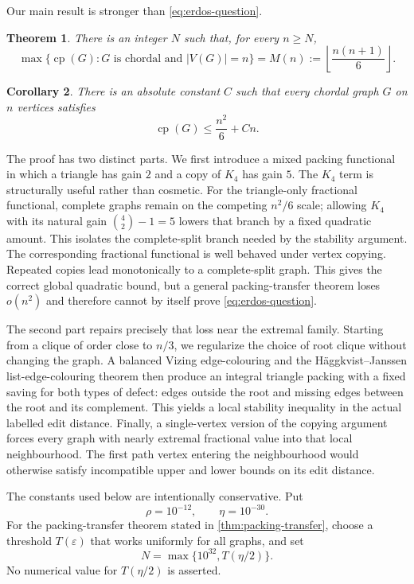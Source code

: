 \documentclass[11pt,reqno]{amsart}
\numberwithin{equation}{section}
\newtheorem{theorem}{Theorem}[section]
\newtheorem{corollary}[theorem]{Corollary}
\theoremstyle{definition}
\theoremstyle{remark}
\newcommand{\cp}{\operatorname{cp}}
\begin{document}
Our main result is stronger than \eqref{eq:erdos-question}.

\begin{theorem}\label{thm:main}
There is an integer $N$ such that, for every $n\geq N$,
\[
  \max\{\cp(G): G\text{ is chordal and }|V(G)|=n\}
  =M(n):=\left\lfloor\frac{n(n+1)}6\right\rfloor .
\]
\end{theorem}

\begin{corollary}\label{cor:erdos81}
There is an absolute constant $C$ such that every chordal graph $G$ on $n$
vertices satisfies
\[
  \cp(G)\leq \frac{n^2}{6}+Cn.
\]
\end{corollary}

The proof has two distinct parts.  We first introduce a mixed packing
functional in which a triangle has gain $2$ and a copy of $K_4$ has gain $5$.
The $K_4$ term is structurally useful rather than cosmetic.  For the
triangle-only fractional functional, complete graphs remain on the competing
$n^2/6$ scale; allowing $K_4$ with its natural gain $\binom42-1=5$ lowers
that branch by a fixed quadratic amount.  This isolates the complete-split
branch needed by the stability argument.
The corresponding fractional functional is well behaved under vertex
copying.  Repeated copies lead monotonically to a complete-split graph.  This
gives the correct global quadratic bound, but a general packing-transfer
theorem loses $o(n^2)$ and therefore cannot by itself prove
\eqref{eq:erdos-question}.

The second part repairs precisely that loss near the extremal family.  Starting
from a clique of order close to $n/3$, we regularize the choice of root clique
without changing the graph.  A balanced Vizing edge-colouring and the
H\"aggkvist--Janssen list-edge-colouring theorem then produce an integral
triangle packing with a fixed saving for both types of defect: edges outside
the root and missing edges between the root and its complement.  This yields a
local stability inequality in the actual labelled edit distance.  Finally, a
single-vertex version of the copying argument forces every graph with nearly
extremal fractional value into that local neighbourhood.  The first path
vertex entering the neighbourhood would otherwise satisfy incompatible upper
and lower bounds on its edit distance.

The constants used below are intentionally conservative.  Put
\begin{equation}\label{eq:constants}
  \rho=10^{-12},\qquad \eta=10^{-30}.
\end{equation}
For the packing-transfer theorem stated in \cref{thm:packing-transfer}, choose
a threshold $T(\varepsilon)$ that works uniformly for all graphs, and set
\begin{equation}\label{eq:N-definition}
  N=\max\{10^{32},T(\eta/2)\}.
\end{equation}
No numerical value for $T(\eta/2)$ is asserted.
\end{document}
